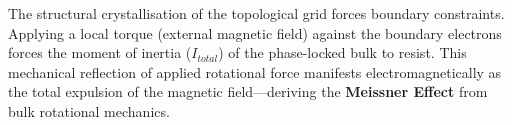 The structural crystallisation of the topological grid forces boundary constraints. Applying a local torque (external magnetic field) against the boundary electrons forces the moment of inertia ($I_{total}$) of the phase-locked bulk to resist. This mechanical reflection of applied rotational force manifests electromagnetically as the total expulsion of the magnetic field---deriving the \textbf{Meissner Effect} from bulk rotational mechanics.
